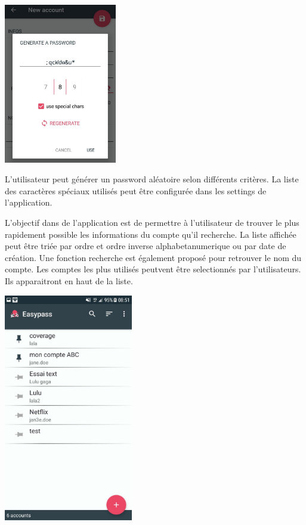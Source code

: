 \includegraphics[height=7cm]{generate_password.jpg}

L'utilisateur peut générer un password aléatoire selon différents critères. La liste des caractères spéciaux utilisés peut être configurée dans les settings de l'application.

 L'objectif dans de l'application \easypass{} est de permettre à l'utilisateur de trouver le plus rapidement possible les informations du compte qu'il recherche. La liste affichée peut être triée par ordre et ordre inverse alphabetanumerique ou par date de création. Une fonction recherche est également proposé pour retrouver le nom du compte. Les comptes les plus utilisés peutvent être selectionnés par l'utilisateurs. Ils apparaitront en haut de la liste. 

\includegraphics[height=10cm]{liste.jpg}

